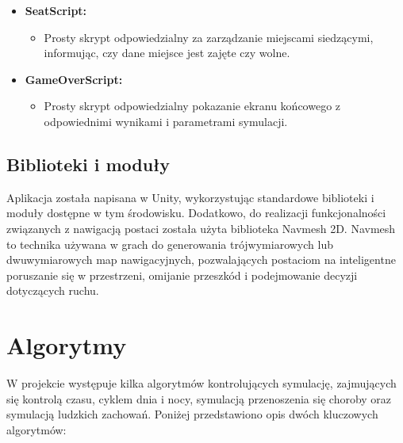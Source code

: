 \begin{itemize}
	\item \textbf{SeatScript:}
	\begin{itemize}
		\item Prosty skrypt odpowiedzialny za zarządzanie miejscami siedzącymi, informując, czy dane miejsce jest zajęte czy wolne.
	\end{itemize}
	\item \textbf{GameOverScript:}
	\begin{itemize}
		\item Prosty skrypt odpowiedzialny pokazanie ekranu końcowego z odpowiednimi wynikami i parametrami symulacji.
	\end{itemize}
\end{itemize}

\subsection{Biblioteki i moduły}
Aplikacja została napisana w Unity, wykorzystując standardowe biblioteki i moduły dostępne w tym środowisku. Dodatkowo, do realizacji funkcjonalności związanych z nawigacją postaci została użyta biblioteka Navmesh 2D. Navmesh to technika używana w grach do generowania trójwymiarowych lub dwuwymiarowych map nawigacyjnych, pozwalających postaciom na inteligentne poruszanie się w przestrzeni, omijanie przeszkód i podejmowanie decyzji dotyczących ruchu.

\section{\textbf{Algorytmy}}

W projekcie występuje kilka algorytmów kontrolujących symulację, zajmujących się kontrolą czasu, cyklem dnia i nocy, symulacją przenoszenia się choroby oraz symulacją ludzkich zachowań. Poniżej przedstawiono opis dwóch kluczowych algorytmów:
